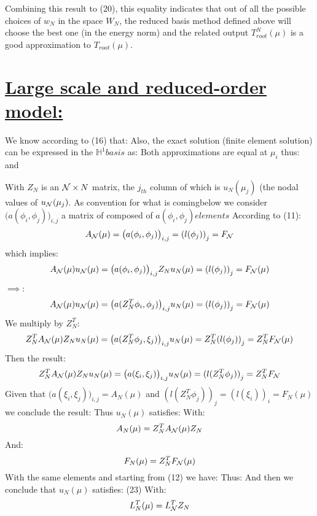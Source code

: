 Combining this result to (20), this equality indicates that out of all the possible choices of $w_N$ in the space $W_N$, the reduced basis method defined above will choose the best one (in the energy norm) and the related output $T_{root}^N(\mu)$ is a good approximation to $T_{root}(\mu)$. 

\section[Question c: Large scale and reduced-order model]{\uline{Large scale and reduced-order model:}}
We know according to (16) that:
Also, the exact solution (finite element solution) can be expressed in the $\mathbb{H}^1 basis$ as:
Both approximations are equal at $\mu_i$ thus:
and 

With $Z_N$ is an ${\cal {N}} \times N$ matrix, the $j_{th}$ column of which is $u_N (\mu_j)$ (the nodal values of $u_{\cal N} (\mu_j)$. As convention for what is comingbelow we consider $\big(a(\phi_i,\phi_j)\big)_{i,j} $ a matrix of composed of $a(\phi_i,\phi_j) elements$
According to (11):
$$A_{\cal N}(\mu) = \big(a(\phi_i,\phi_j)\big)_{i,j} = {(l(\phi_j))}_j = F_{\cal N}$$
which implies:
$$A_{\cal N}(\mu) u_{\cal N}(\mu)= \big(a(\phi_i,\phi_j)\big)_{i,j} Z_N u_{N}(\mu) = {(l(\phi_j))}_j = F_{\cal N}(\mu)$$
$\implies$:
$$A_{\cal N}(\mu) u_{\cal N}(\mu)= \big(a(Z_N ^T \phi_i,\phi_j)\big)_{i,j} u_{N}(\mu) = {(l(\phi_j))}_j = F_{\cal N}(\mu)$$
We multiply by $Z_{N}^T$:
$$ Z_{N}^T A_{\cal N}(\mu) Z_{N} u_{ N}(\mu)= \big(a(Z_{N}^T \phi_j,\xi_j)\big)_{i,j} u_{N}(\mu) = Z_{N}^T  {(l(\phi_j))}_j = Z_{N}^T F_{\cal N}(\mu)$$
Then the result:
$$ Z_{N}^T A_{\cal N}(\mu) Z_{N} u_{ N}(\mu)= \big(a(\xi_i,\xi_j)\big)_{i,j} u_{N}(\mu) =  {(l(Z_{N}^T \phi_j))}_j = Z_{N}^T F_{\cal N}$$
Given that $\big(a(\xi_i,\xi_j)\big)_{i,j} = A_N(\mu)$ and ${(l(Z_{N}^T \phi_j))}_j = {(l(\xi_i))}_i = F_N(\mu)$ we conclude the result:
Thus $u_{ N}(\mu)$ satisfies:
With:
$$A_{ N}(\mu) = Z_{N}^T A_{\cal N}(\mu) Z_{N}$$
And:
$$F_{ N}(\mu)=Z_N^T F_{\cal N}(\mu)$$
With the same elements and starting from (12) we have:
 {}
Thus:
 {}
And then we conclude that $u_{ N}(\mu)$ satisfies:
 {(23)}
With:
$$L_{ N}^T(\mu)= L_{\cal N}^T Z_N $$

